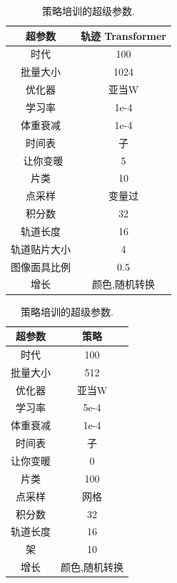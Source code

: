 \documentclass[conference]{IEEEtran}
\begin{document}
\begin{table}[ht]
\begin{minipage}[c]{0.48\textwidth}
\makeatletter{}
\centering
\caption{轨迹 Transformer训练的超参数.}
\begin{tabular}{@{}cc@{}}
    \toprule
    超参数 & 轨迹 Transformer \\
    \midrule
    时代 & 100  \\
    批量大小 &  1024  \\
    优化器 & 亚当W  \\
    学习率 & 1e-4  \\
    体重衰减 & 1e-4 \\
    时间表 & 子  \\\
    让你变暖 & 5 \\
    片类 & 10 \\
    点采样 & 变量过 \\
    积分数 & 32 \\
    轨道长度 & 16 \\
    轨道贴片大小 & 4 \\
    图像面具比例 & 0.5 \\
    增长 & 颜色,随机转换 \\
    \bottomrule
\end{tabular}
\label{tab:tt-hyperparameter}
\end{minipage}
\begin{minipage}[c]{0.48\textwidth}
\makeatletter{}
\centering
  \caption{策略培训的超级参数.}
  \begin{tabular}{@{}cc@{}}
    \toprule
    超参数 & 策略  \\
    \midrule
    时代 & 100  \\
    批量大小 &  512  \\
    优化器 &  亚当W  \\
    学习率 & 5e-4  \\
    体重衰减 & 1e-4 \\
    时间表 & 子  \\
    让你变暖 & 0 \\
    片类 & 100 \\
    点采样 & 网格 \\
    积分数 & 32 \\
    轨道长度 & 16 \\
    架 & 10 \\
    增长 & 颜色,随机转换 \\
    \bottomrule
  \end{tabular}
  \label{tab:policy-hyperparameter}
\end{minipage}
\end{table}
\end{document}
